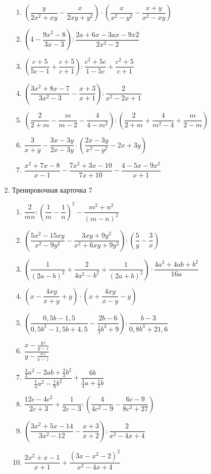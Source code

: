 \documentclass[12pt, a4paper]{article}
\begin{document}
\begin{enumerate}
\begin{enumerate}[label=\asbuk*)]
			\item \( \left( \dfrac{y}{2x^2+xy}-\dfrac{x}{2xy+y^2} \right) \cdot\left( \dfrac{x}{x^2-y^2}-\dfrac{x+y}{x^2-xy} \right)\)
			\item \( \left( 4-\dfrac{9x^2-8}{3x-3} \right):\dfrac{2a+6x-3ax-9x2}{2x^2-2} \)
			\item \( \left( \dfrac{c+5}{5c-1}+\dfrac{c+5}{c+1} \right) :\dfrac{c^2+5c}{1-5c}+\dfrac{c^2+5}{c+1}\)
			\item \( \left( \dfrac{3x^2+8x-7}{3x^2-3}-\dfrac{x+3}{x+1} \right):\dfrac{2}{x^2-2x+1} \)
			\item \( \left( \dfrac{2}{2+m}-\dfrac{m}{m-2}-\dfrac{4}{4-m^2} \right) :\left( \dfrac{2}{2+m}+\dfrac{4}{m^2-4}+\dfrac{m}{2-m} \right)\)
			\item \( \dfrac{3}{x+y}-\dfrac{3x-3y}{2x-3y}\cdot\left( \dfrac{2x-3y}{x^2-y^2}-2x+3y \right) \)
			\item \( \dfrac{x^2+7x-8}{x-1}-\dfrac{7x^2+3x-10}{7x+10}-\dfrac{4-5x-9x^2}{x+1} \)
		\end{enumerate}
	\item Тренировочная карточка 7
	\begin{enumerate}[label=\asbuk*)]
		\item \( \dfrac{2}{mn}:\left( \dfrac{1}{m}-\dfrac{1}{n} \right)^2-\dfrac{m^2+n^2}{(m-n)^2} \)
		\item \( \left( \dfrac{5x^2-15xy}{x^2-9y^2}-\dfrac{3xy+9y^2}{x^2+6xy+9y^2} \right) :\left( \dfrac{5}{y}-\dfrac{3}{x} \right)\)
		\item \( \left( \dfrac{1}{(2a-b)^2}+\dfrac{2}{4a^2-b^2}+\dfrac{1}{(2a+b)^2} \right)\cdot\dfrac{4a^2+4ab+b^2}{16a} \)
		\item \( \left( x-\dfrac{4xy}{x+y}+y \right) \cdot\left( x+\dfrac{4xy}{x-y}-y \right)\)
		\item \( \left( \dfrac{0,5b-1,5}{0,5b^2-1,5b+4,5}-\dfrac{2b-6}{\frac{1}{3}b^3+9} \right):\dfrac{b-3}{0,8b^3+21,6} \)
		\item \( \dfrac{x-\frac{yz}{y-z}}{y-\frac{xz}{x-z}} \)
		\item \( \dfrac{\frac{3}{2}a^2-2ab+\frac{2}{3}b^2}{\frac{1}{4}a^2-\frac{1}{9}b^2}+\dfrac{6b}{\frac{3}{4}a+\frac{1}{2}b} \)
		\item \( \dfrac{12c-4c^2}{2c+3}+\dfrac{1}{2c-3}:\left( \dfrac{4}{4c^2-9} -\dfrac{6c-9}{8c^3+27}\right) \)
		\item \( \left( \dfrac{3x^2+5x-14}{3x^2-12}-\dfrac{x+3}{x+2} \right) :\dfrac{2}{x^2-4x+4}\)
		\item \( \dfrac{2x^2+x-1}{x+1}+\dfrac{(3x-x^2-2)^2}{x^2-4x+4} \)

\end{enumerate}
\end{enumerate}
\end{document}
